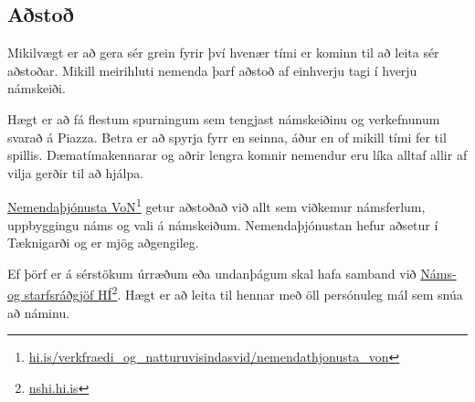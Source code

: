 \documentclass[justified, nobib]{tufte-handout}
\begin{document}
\subsection{Aðstoð}
\label{sec:help}
Mikilvægt er að gera sér grein fyrir því hvenær tími er kominn til að leita sér aðstoðar. Mikill meirihluti nemenda þarf aðstoð af einhverju tagi í hverju námskeiði.

Hægt er að fá flestum spurningum sem tengjast námskeiðinu og verkefnunum svarað á Piazza. Betra er að spyrja fyrr en seinna, áður en of mikill tími fer til spillis. Dæmatímakennarar og aðrir lengra komnir nemendur eru líka alltaf allir af vilja gerðir til að hjálpa.

\href{http://www.hi.is/verkfraedi\_og\_natturuvisindasvid/nemendathjonusta\_von}{Nemendaþjónusta VoN}\footnote{\url{hi.is/verkfraedi_og_natturuvisindasvid/nemendathjonusta_von}} getur aðstoðað við allt sem viðkemur námsferlum, uppbyggingu náms og vali á námskeiðum. Nemendaþjónustan hefur aðsetur í Tæknigarði og er mjög aðgengileg.

Ef þörf er á sérstökum úrræðum eða undanþágum skal hafa samband við \href{http://nshi.hi.is/}{Náms- og starfsráðgjöf HÍ}\footnote{\url{nshi.hi.is}}. Hægt er að leita til hennar með öll persónuleg mál sem snúa að náminu.
\end{document}
